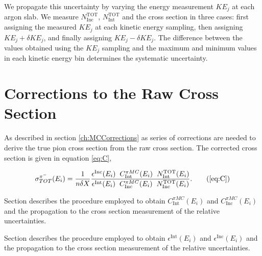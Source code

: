 We propagate this uncertainty  by varying the energy measurement $KE_{j}$ at each argon slab. We measure $N^{\text{TOT}}_{\text{Inc}}$,  $N^{\text{TOT}}_{\text{Int}}$ and the cross section  in three cases: first assigning the measured $KE_{j}$ at each kinetic energy sampling, then assigning $KE_{j} + \delta KE_{j}$, and finally assigning $KE_{j} - \delta KE_{j}$. The difference between the values obtained using the $KE_{j}$ sampling and the maximum and minimum values in each kinetic energy bin determines the systematic uncertainty.


\section{Corrections to the Raw Cross Section}\label{ch:PionXSCorrections}
As described in section \ref{ch:MCCorrections} as series of corrections are needed to derive the true pion cross section from the raw cross section. 
The corrected cross section is given in equation \ref{eq:C}, 

\begin{equation}
   \sigma^{\pi^-}_{TOT}(E_{i})  = \frac{1}{n \delta X}\frac{ \epsilon^{\text{Inc}}(E_i)  \hspace{0.2cm} C^{\pi MC}_{\text{Int}} (E_{i}) \hspace{0.2cm} N^{\text{TOT}}_{\text{Int}} (E_{i}) }{   \epsilon^{\text{Int}}(E_i) \hspace{0.2cm} C^{\pi MC}_{\text{Inc}} (E_{i}) \hspace{0.2cm}  N^{\text{TOT}}_{\text{Inc}} (E_{i})}.
 \tag{\ref{eq:C}}
\end{equation}

Section \label{ch:BKGsubXS} describes the procedure employed to obtain  
$C^{\pi MC}_{\text{Int}} (E_{i})$  and  $C^{\pi MC}_{\text{Inc}} (E_{i})$ and the propagation to the cross section measurement of the relative uncertainties.

Section \label{ch:ch:EFFXS} describes the procedure employed to obtain  
$\epsilon^{\text{Int}}(E_i)$  and $\epsilon^{\text{Inc}}(E_i)$ and the propagation to the cross section measurement of the relative uncertainties.


